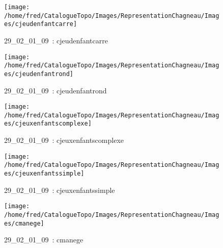 \documentclass[12pt,titlepage]{book}
\begin{document}
\begin{figure}[h!]
\begin{minipage}[t]{3cm}
  \end{minipage}
  \begin{minipage}[t]{3cm}
    \begin{center}
      \texttt{[image: /home/fred/CatalogueTopo/Images/RepresentationChagneau/Images/cjeudenfantcarre]}
      \caption[~29\_02\_01\_09]{\small{29\_02\_01\_09~:} \tiny{cjeudenfantcarre}}\label{cjeudenfantcarre}
    \end{center}
  \end{minipage}
  \begin{minipage}[t]{3cm}
    \begin{center}
      \texttt{[image: /home/fred/CatalogueTopo/Images/RepresentationChagneau/Images/cjeudenfantrond]}
      \caption[~29\_02\_01\_09]{\small{29\_02\_01\_09~:} \tiny{cjeudenfantrond}}\label{cjeudenfantrond}
    \end{center}
  \end{minipage}
  \begin{minipage}[t]{3cm}
    \begin{center}
      \texttt{[image: /home/fred/CatalogueTopo/Images/RepresentationChagneau/Images/cjeuxenfantscomplexe]}
      \caption[~29\_02\_01\_09]{\small{29\_02\_01\_09~:} \tiny{cjeuxenfantscomplexe}}\label{cjeuxenfantscomplexe}
    \end{center}
  \end{minipage}
  \begin{minipage}[t]{3cm}
    \begin{center}
      \texttt{[image: /home/fred/CatalogueTopo/Images/RepresentationChagneau/Images/cjeuxenfantssimple]}
      \caption[~29\_02\_01\_09]{\small{29\_02\_01\_09~:} \tiny{cjeuxenfantssimple}}\label{cjeuxenfantssimple}
    \end{center}
  \end{minipage}
  \begin{minipage}[t]{3cm}
    \begin{center}
      \texttt{[image: /home/fred/CatalogueTopo/Images/RepresentationChagneau/Images/cmanege]}
      \caption[~29\_02\_01\_09]{\small{29\_02\_01\_09~:} \tiny{cmanege}}\label{cmanege}
    \end{center}
  \end{minipage}
  \begin{minipage}[t]{3cm}

\end{minipage}
\end{figure}
\end{document}
